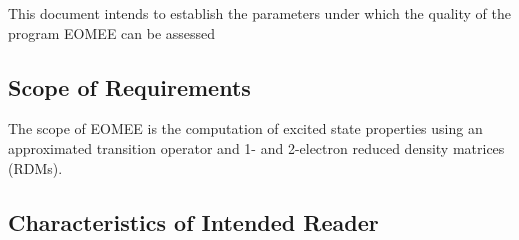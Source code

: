 \documentclass[12pt]{article}
\begin{document}

	This document intends to establish the parameters under which the quality 
	of the program EOMEE can be assessed %

\subsection{Scope of Requirements} 

%
The scope of EOMEE is the computation of excited state properties using an 
approximated transition operator and 1- and 2-electron reduced density matrices 
(RDMs).


\subsection{Characteristics of Intended Reader} \label{sec_IntendedReader}
\end{document}
